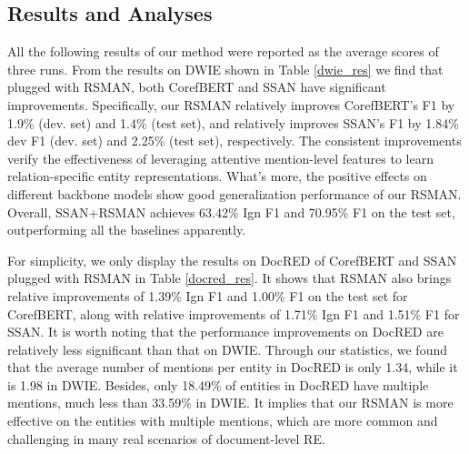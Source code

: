 \documentclass[11pt]{article}
\begin{document}
\begin{table}[t]
  \centering
 \vspace{-0.2cm}
  \caption{Comparison on DocRED. The results of baselines are from their related papers. All test results are obtained by submitting to official Codalab\footnotemark[2].}
  \label{docred_res}\vspace{-0.2cm}
\end{table}

\subsection{Results and Analyses}\label{res and ana}
All the following results of our method were reported as the average scores of three runs. From the results on DWIE shown in Table \ref{dwie_res} we find that plugged with RSMAN, both CorefBERT and SSAN have significant improvements. Specifically, our RSMAN relatively improves CorefBERT's F1 by 1.9\% (dev. set) and 1.4\% (test set), and relatively improves SSAN's F1 by 1.84\% dev F1 (dev. set) and 2.25\% (test set), respectively. The consistent improvements verify the effectiveness of leveraging attentive mention-level features to learn relation-specific entity representations. What's more, the positive effects on different backbone models show good generalization performance of our RSMAN. Overall, SSAN+RSMAN achieves 63.42\% Ign F1 and 70.95\% F1 on the test set, outperforming all the baselines apparently.

For simplicity, we only display the results on DocRED of CorefBERT and SSAN plugged with RSMAN in Table \ref{docred_res}. It shows that RSMAN also brings relative improvements of 1.39\% Ign F1 and 1.00\% F1 on the test set for CorefBERT, along with relative improvements of 1.71\% Ign F1 and 1.51\% F1 for SSAN. It is worth noting that the performance improvements on DocRED are relatively less significant than that on DWIE. Through our statistics, we found that the average number of mentions per entity in DocRED is only 1.34, while it is 1.98 in DWIE. Besides, only 18.49\% of entities in DocRED have multiple mentions, much less than 33.59\% in DWIE. It implies that our RSMAN is more effective on the entities with multiple mentions, which are more common and challenging in many real scenarios of document-level RE.
\end{document}
